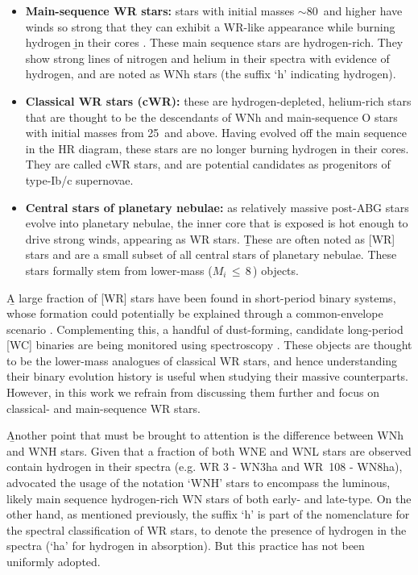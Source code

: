 \begin{itemize}
    \item \textbf{Main-sequence WR stars:} stars with initial masses ${\sim}80\,$\Msun{} and higher have winds so strong that they can exhibit a WR-like appearance while burning hydrogen \b{in their cores \citep{langer_towards_1994,1995Crowtherb_fundamental_WNL,1997deKoter}. These main sequence stars are hydrogen-rich. They show strong lines of nitrogen and helium in their spectra with evidence of hydrogen, and are noted as WNh stars (the suffix `h' indicating hydrogen).}
    \item \textbf{Classical WR stars (cWR):} these are hydrogen-depleted, helium-rich stars that are thought to be the descendants of WNh and main-sequence O stars with initial masses from 25\,\Msun{} and above. Having evolved off the main sequence in the HR diagram, these stars are no longer burning hydrogen in their cores. They are called cWR stars, and are potential candidates as progenitors of type-Ib/c supernovae.
    \item \textbf{Central stars of planetary nebulae:} as relatively massive post-ABG stars evolve into planetary nebulae, the inner core that is exposed is hot enough to drive strong winds, appearing as WR stars. \b{These are often noted as [WR] stars \citep[e.g.][]{1974Webster_Glass_BrWR} and are a small subset of all central stars of planetary nebulae. These stars formally stem from lower-mass ($M_i\,\leq\,8\,$\Msun{}) objects.}
\end{itemize}

\b{A large fraction of [WR] stars have been found in short-period binary systems, whose formation could potentially be explained through a common-envelope scenario \citep{2009Miszalski_BrWR_closebinaries,2011Miszalski_binarity_morphology,2015Jones_CE_WR_binaries}. Complementing this, a handful of dust-forming, candidate long-period [WC] binaries are being monitored using spectroscopy \citep{2015Manick_WR_longperiodRVs,2015Miszalski_WRbinary_postCE}. These objects are thought to be the lower-mass analogues of classical WR stars, and hence understanding their binary evolution history is useful when studying their massive counterparts. However, in this work we refrain from discussing them further and focus on classical- and main-sequence WR stars.}

\b{Another point that must be brought to attention is the difference between WNh and WNH stars. Given that a fraction of both WNE and WNL stars are observed contain hydrogen in their spectra (e.g. WR 3 - WN3ha and WR 108 - WN8ha), \citet{2008smithconti_WNH} advocated the usage of the notation `WNH' stars to encompass the luminous, likely main sequence hydrogen-rich WN stars of both early- and late-type. On the other hand, as mentioned previously, the suffix `h' is part of the nomenclature for the spectral classification of WR stars, to denote the presence of hydrogen in the spectra (`ha' for hydrogen in absorption). But this practice has not been uniformly adopted.}

